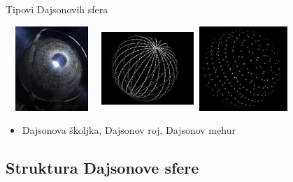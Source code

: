 \documentclass[13pt]{beamer}
\begin{document}
\begin{frame}{Tipovi Dajsonovih sfera}

\includegraphics[width=3.5cm, height=3.2cm]{images/Dajsonova skoljka.png}
\includegraphics[width=3.5cm, height=3.2cm]{images/Dajsonov roj.png}
\includegraphics[width=3.5cm, height=3.2cm]{images/Dajsonov mehur.png}

\begin{itemize}
    \item Dajsonova školjka, Dajsonov roj, Dajsonov mehur
\end{itemize}

\end{frame}

\subsection{Struktura Dajsonove sfere}
\end{document}
